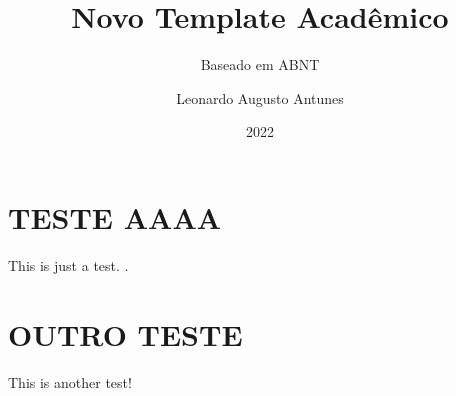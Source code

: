 \documentclass{AcademicNew}
\author{Leonardo Augusto Antunes}
\title{Novo Template Acadêmico}
\subtitle{Baseado em ABNT}
\date{2022}
\begin{document}
    \cover
    \titlePage
    \contents

    \section{\normalsize{\MakeUppercase{Teste aaaa}}}

    This is just a test. \cite{weber2010}.

    \newpage
    \section{\normalsize{\MakeUppercase{Outro teste}}}

    This is another test! \cite{weber2010internet}

    \biblio
\end{document}
